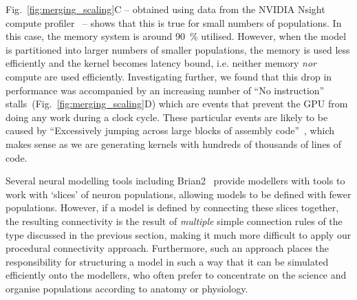 \documentclass[9pt,a4paper]{amsart}
\newcommand{\todo}[1]{\textbf{\textsc{\textcolor{red}{(TODO: #1)}}}}
\begin{document}
Fig.~\ref{fig:merging_scaling}C -- obtained using data from the NVIDIA Nsight compute profiler~\citep{NVIDIACorporation2020} -- shows that this is true for small numbers of populations.
In this case, the memory system is around \SI{90}{\percent} utilised.
However, when the model is partitioned into larger numbers of smaller populations, the memory is used less efficiently and the kernel becomes latency bound, i.e. neither memory \emph{nor} compute are used efficiently.
Investigating further, we found that this drop in performance was accompanied by an increasing number of ``No instruction'' stalls~(Fig.~\ref{fig:merging_scaling}D) which are events that prevent the GPU from doing any work during a clock cycle.
These particular events are likely to be caused by ``Excessively jumping across large blocks of assembly code''~\citep[p47]{NVIDIACorporation2020}, which makes sense as we are generating kernels with hundreds of thousands of lines of code.

Several neural modelling tools including Brian2~\citep{Stimberg2019} provide modellers with tools to work with `slices' of neuron populations, allowing models to be defined with fewer populations.
However, if a model is defined by connecting these slices together, the resulting connectivity is the result of \emph{multiple} simple connection rules of the type discussed in the previous section, making it much more difficult to apply our procedural connectivity approach.
Furthermore, such an approach places the responsibility for structuring a model in such a way that it can be simulated efficiently onto the modellers, who often prefer to concentrate on the science and organise populations according to anatomy or physiology.
\end{document}
